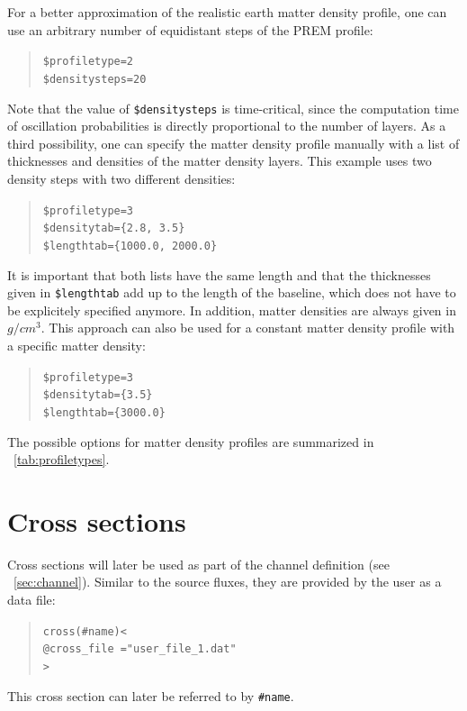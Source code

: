 For a better approximation of the realistic earth matter density profile, one can use an arbitrary number of equidistant steps of the PREM profile:
\begin{quote}
{\tt \$profiletype=2 } \\
{\tt \$densitysteps=20 }
\end{quote}
Note that the value of {\tt \$densitysteps} is time-critical, since the
computation time of oscillation probabilities is directly 
proportional to the number of layers.
%
As a  third possibility, one can specify the matter density profile 
manually with a list of thicknesses and densities of the matter density layers. This example uses two density steps with two different densities:
\begin{quote}
{\tt \$profiletype=3 } \\
{\tt \$densitytab=\{2.8, 3.5\}}\\
{\tt \$lengthtab=\{1000.0, 2000.0\}}
\end{quote}
It is important that both lists have the same length and that the  thicknesses given in  {\tt \$lengthtab} add up to the length of
the baseline, which does not have to be explicitely specified anymore. In addition, matter densities are always given in $g/cm^3$.
%
This approach can also be used for a constant matter density profile with
a specific matter density:
\begin{quote}
{\tt \$profiletype=3 } \\
{\tt \$densitytab=\{3.5\}}\\
{\tt \$lengthtab=\{3000.0\}}
\end{quote}
The possible options for matter density profiles are summarized in \Tab~\ref{tab:profiletypes}.


\section{Cross sections}
\label{sec:cross_section}

Cross sections will later be used as part of the 
channel definition (see \Sec~\ref{sec:channel}). Similar to the source 
fluxes, they are provided by the user as a data file:
\begin{quote}
{\tt cross(\#name)<}\\
{\tt \tb @cross\_file ="user\_file\_1.dat"}\\
{\tt >}
\end{quote}  
This cross section can later be referred to by {\tt \#name}.

